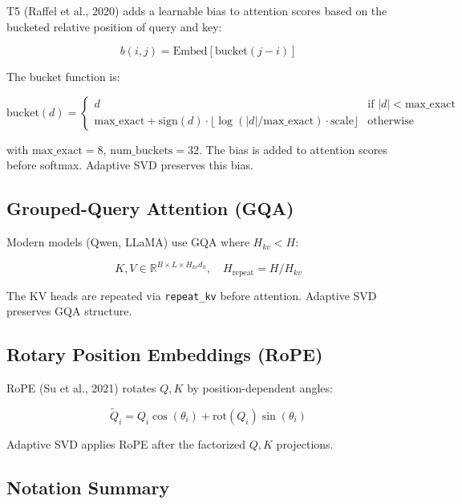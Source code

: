 T5 (Raffel et al., 2020) adds a learnable bias to attention scores based on 
the bucketed relative position of query and key:

\[
b(i, j) = \text{Embed}[\text{bucket}(j - i)]
\tag{3.9}
\]

The bucket function is:

\[
\text{bucket}(d) = \begin{cases}
d & \text{if } |d| < \text{max\_exact} \\
\text{max\_exact} + \text{sign}(d) \cdot \lfloor \log(|d| / \text{max\_exact}) \cdot \text{scale} \rfloor & \text{otherwise}
\end{cases}
\tag{3.10}
\]

with $\text{max\_exact} = 8$, $\text{num\_buckets} = 32$. The bias is added 
to attention scores before softmax. Adaptive SVD preserves this bias.

\subsection{Grouped-Query Attention (GQA)}

Modern models (Qwen, LLaMA) use GQA where $H_{kv} < H$:

\[
K, V \in \mathbb{R}^{B \times L \times H_{kv} d_h}, \quad H_\text{repeat} = H / H_{kv}
\tag{3.11}
\]

The KV heads are repeated via \texttt{repeat\_kv} before attention. Adaptive SVD 
preserves GQA structure.

\subsection{Rotary Position Embeddings (RoPE)}

RoPE (Su et al., 2021) rotates $Q, K$ by position-dependent angles:

\[
\tilde{Q}_i = Q_i \cos(\theta_i) + \mathrm{rot}(Q_i) \sin(\theta_i)
\tag{3.12}
\]

Adaptive SVD applies RoPE after the factorized $Q, K$ projections.

\subsection{Notation Summary}
